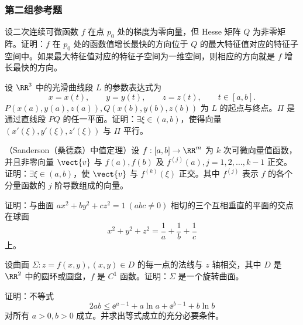 \subsubsection*{第二组参考题}
\begin{xreferenceproblem}[1]
设二次连续可微函数 $f$ 在点 $p_0$ 处的梯度为零向量，但 Hesse 矩阵 $Q$ 为非零矩阵。证明：$f$ 在 $p_0$ 处的函数值增长最快的方向位于 $Q$ 的最大特征值对应的特征子空间中。如果最大特征值对应的特征子空间为一维空间，则相应的方向就是 $f$ 增长最快的方向。
\end{xreferenceproblem}

\begin{xreferenceproblem}[2]
设 $\RR^3$ 中的光滑曲线段 $L$ 的参数表达式为
  \[
    x=x(t),\qquad y=y(t),\qquad z=z(t),\qquad t\in[a,b].
  \]
  $P(x(a),y(a),z(a)),Q(x(b),y(b),z(b))$ 为 $L$ 的起点与终点。$\Pi$ 是通过直线段 $PQ$ 的任一平面。证明：$\exists\xi\in(a,b)$，使得向量 $(x'(\xi),y'(\xi),z'(\xi))$ 与 $\Pi$ 平行。
\end{xreferenceproblem}

\begin{xreferenceproblem}[3]
（Sanderson（桑德森）中值定理）设 $f:[a,b]\to\RR^m$ 为 $k$ 次可微向量值函数，并且非零向量 $\vect{v}$ 与 $f(a),f(b)$ 及 $f^{(j)}(a),j=1,2,\ldots,k-1$ 正交。证明：$\exists\xi\in(a,b)$，使 $\vect{v}$ 与 $f^{(k)}(\xi)$ 正交。其中 $f^{(j)}$ 表示 $f$ 的各个分量函数的 $j$ 阶导数组成的向量。
\end{xreferenceproblem}

\begin{xreferenceproblem}[4]
证明：与曲面 $ax^2+by^2+cz^2=1\ (abc\ne0)$ 相切的三个互相垂直的平面的交点在球面
  \[
    x^2+y^2+z^2=\frac1a+\frac1b+\frac1c
  \]
  上。
\end{xreferenceproblem}

\begin{xreferenceproblem}[5]
设曲面 $\Sigma:z=f(x,y),(x,y)\in D$ 的每一点的法线与 $z$ 轴相交，其中 $D$ 是 $\RR^2$ 中的圆环或圆盘，$f$ 是 $C^1$ 函数。证明：$\Sigma$ 是一个旋转曲面。
\end{xreferenceproblem}

\begin{xreferenceproblem}[6]
证明：不等式
  \[
    2ab\le\ee^{a-1}+a\ln a+\ee^{b-1}+b\ln b
  \]
  对所有 $a>0,b>0$ 成立。并求出等式成立的充分必要条件。
\end{xreferenceproblem}

